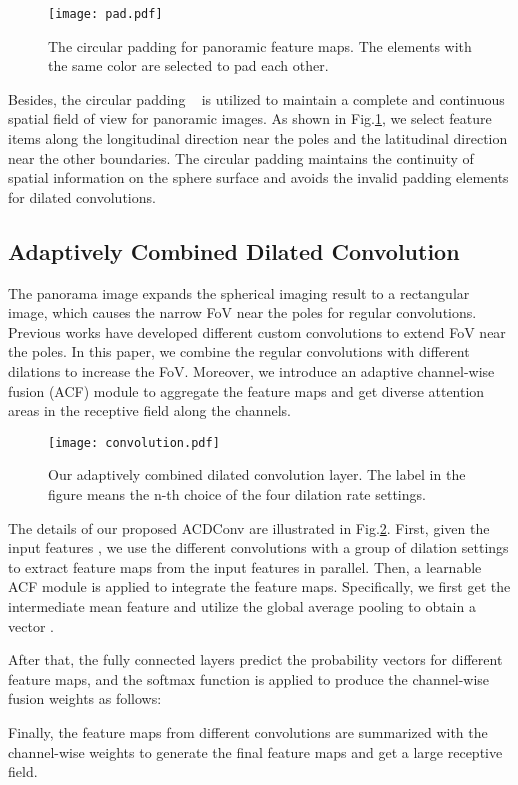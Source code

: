 \documentclass[letterpaper]{article} \usepackage{aaai21}  \usepackage{times}  \usepackage{helvet} \usepackage{courier}  \usepackage[hyphens]{url}  \usepackage{graphicx} \urlstyle{rm} \def\UrlFont{\rm}  \usepackage{natbib}  \usepackage{caption} \frenchspacing  \setlength{\pdfpagewidth}{8.5in}  \setlength{\pdfpageheight}{11in}
\newcommand{\newchange}[1]{{\color{black}#1}}
\begin{document}
\begin{figure}[tb]
\centering
  \texttt{[image: pad.pdf]}
  \caption{The circular padding for panoramic feature maps. The elements with the same color are selected to pad each other.}
  \label{fig:pad}
\end{figure}

Besides, the circular padding ~\cite{DBLP:conf/icra/WangHLHZS18} is utilized to maintain a complete and continuous spatial field of view for panoramic images. As shown in Fig.\ref{fig:pad}, we select feature items along the longitudinal direction near the poles and the latitudinal direction near the other boundaries. The circular padding maintains the continuity of spatial information on the sphere surface and avoids the invalid padding elements for dilated convolutions.

\subsection{Adaptively Combined Dilated Convolution}

The panorama image expands the spherical imaging result to a rectangular image, which causes the narrow FoV near the poles for regular convolutions. Previous works have developed different custom convolutions to extend FoV near the poles. In this paper, we combine the regular convolutions with different dilations to increase the FoV. Moreover, we introduce an adaptive channel-wise fusion (ACF) module to aggregate the feature maps and get diverse attention areas in the receptive field along the channels. 

\begin{figure}[tb]
\centering
  \texttt{[image: convolution.pdf]}
  \caption{Our adaptively combined dilated convolution layer. The label  in the figure means the n-th choice of the four dilation rate settings.}
  \label{fig:convolution}
\end{figure}

The details of our proposed ACDConv are illustrated in Fig.\ref{fig:convolution}. First, given the input features \newchange{}, we use the different convolutions with a group of dilation settings to extract feature maps \newchange{} from the input features in parallel. Then, a learnable ACF module is applied to integrate the feature maps. Specifically, we first get the intermediate mean feature and utilize the global average pooling to obtain a vector \newchange{}. \newchange{After that, the fully connected layers predict the probability vectors  for different feature maps, and the softmax function is applied to produce the channel-wise fusion weights as follows:

Finally, the feature maps  from different convolutions are summarized with the channel-wise weights  to generate the final feature maps  and get a large receptive field.}
\end{document}
